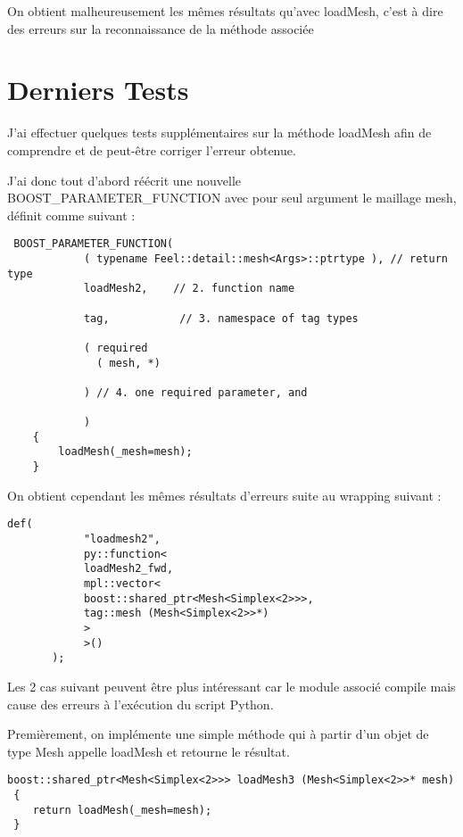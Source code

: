 \documentclass[12pt]{article}
\begin{document}
On obtient malheureusement les mêmes résultats qu'avec loadMesh, c'est à dire des erreurs sur la reconnaissance de la méthode associée

\section{Derniers Tests}

J'ai effectuer quelques tests supplémentaires sur la méthode loadMesh afin de comprendre et de peut-être corriger l'erreur obtenue.

J'ai donc tout d'abord réécrit une nouvelle BOOST\_PARAMETER\_FUNCTION avec pour seul argument le maillage mesh, définit comme suivant :

\begin{lstlisting}
 BOOST_PARAMETER_FUNCTION(
            ( typename Feel::detail::mesh<Args>::ptrtype ), // return type
            loadMesh2,    // 2. function name

            tag,           // 3. namespace of tag types

            ( required
              ( mesh, *)

            ) // 4. one required parameter, and

            )
    {
        loadMesh(_mesh=mesh);
    }
\end{lstlisting}

On obtient cependant les mêmes résultats d'erreurs suite au wrapping suivant :
\begin{lstlisting}
def(
            "loadmesh2",
            py::function<
            loadMesh2_fwd,
            mpl::vector<
            boost::shared_ptr<Mesh<Simplex<2>>>,
            tag::mesh (Mesh<Simplex<2>>*)
            >
            >()
       );
\end{lstlisting}

\vspace{0.5 cm}
Les 2 cas suivant peuvent être plus intéressant car le module associé compile mais cause des erreurs à l'exécution du script Python.

\vspace{0.5 cm}
Premièrement, on implémente une simple méthode qui à partir d'un objet de type Mesh appelle loadMesh et retourne le résultat.
\begin{lstlisting}
boost::shared_ptr<Mesh<Simplex<2>>> loadMesh3 (Mesh<Simplex<2>>* mesh)
 {
    return loadMesh(_mesh=mesh);
 }
\end{lstlisting}
\end{document}
